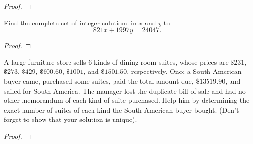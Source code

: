 \documentclass[10pt]{amsart}
\begin{document}
\begin{thm}
\begin{proof}
  \end{proof}
\end{thm}

\begin{thm}\label{ex4}
  Find the complete set of integer solutions in $x$ and $y$ to
  $$821x + 1997y = 24047.$$

  \begin{proof}
  \end{proof}
\end{thm}

\begin{thm}\label{ex5}
  A large furniture store sells 6 kinds of dining room suites, whose prices are $\$231$, $\$273$, $\$429$, $\$600.60$, $\$1001$, and $\$1501.50$, respectively.
  Once a South American buyer came, purchased some suites, paid the total amount due, $\$13519.90$, and sailed for South America.
  The manager lost the duplicate bill of sale and had no other memorandum of each kind of suite purchased.
  Help him by determining the exact number of suites of each kind the South American buyer bought.
  (Don't forget to show that your solution is unique).
  \begin{proof}
  \end{proof}
\end{thm}
\end{document}
